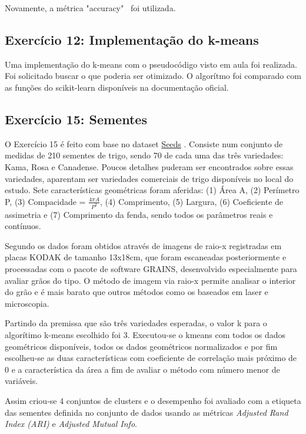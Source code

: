 Novamente, a métrica "accuracy" \ foi utilizada.

\subsection{Exercício 12: Implementação do k-means}
Uma implementação do k-means com o pseudocódigo visto em aula foi realizada. Foi solicitado buscar o que poderia ser otimizado. O algorítmo foi comparado com as funções do scikit-learn disponíveis na documentação oficial.

\subsection{Exercício 15: Sementes}

O Exercício 15 é feito com base no dataset \href{https://archive.ics.uci.edu/ml/datasets/seeds}{Seeds} \citep{dataset_charytanowicz_uci_2012}. Consiste num conjunto de medidas de 210 sementes de trigo, sendo 70 de cada uma das três variedades: Kama, Rosa e Canadense. Poucos detalhes puderam ser encontrados sobre essas variedades, aparentam ser variedades comerciais de trigo disponíveis no local do estudo. Sete características geométricas foram aferidas: (1) Área A, (2) Perímetro P, (3) Compacidade = $\frac{4\pi A}{P^2}$, (4) Comprimento, (5) Largura, (6) Coeficiente de assimetria e (7) Comprimento da fenda, sendo todos os parâmetros reais e contínuos.

Segundo \citep{charytanowicz} os dados foram obtidos através de imagens de raio-x registradas em placas KODAK de tamanho 13x18cm, que foram escaneadas posteriormente e processadas com o pacote de software GRAINS, desenvolvido especialmente para avaliar grãos do tipo. O método de imagem via raio-x permite analisar o interior do grão e é mais barato que outros métodos como os baseados em laser e microscopia\citep{charytanowicz}.

Partindo da premissa que são três variedades esperadas, o valor k para o algorítimo k-means escolhido foi 3. Executou-se o kmeans com todos os dados geométricos disponíveis, todos os dados geométricos normalizados e por fim escolheu-se as duas características com coeficiente de correlação mais próximo de 0 e a característica da área a fim de avaliar o método com número menor de variáveis.

Assim criou-se 4 conjuntos de clusters e o desempenho foi avaliado com a etiqueta das sementes definida no conjunto de dados usando as métricas \textit{Adjusted Rand Index (ARI)} e \textit{Adjusted Mutual Info}.

